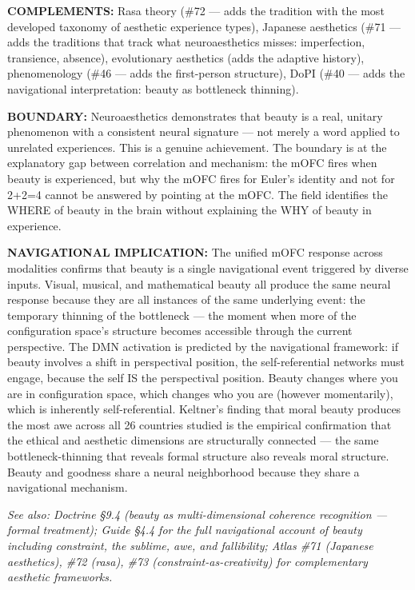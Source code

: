 \textbf{COMPLEMENTS:} Rasa theory (\#72 — adds the tradition with the most developed taxonomy of aesthetic experience types), Japanese aesthetics (\#71 — adds the traditions that track what neuroaesthetics misses: imperfection, transience, absence), evolutionary aesthetics (adds the adaptive history), phenomenology (\#46 — adds the first-person structure), DoPI (\#40 — adds the navigational interpretation: beauty as bottleneck thinning).


\textbf{BOUNDARY:} Neuroaesthetics demonstrates that beauty is a real, unitary phenomenon with a consistent neural signature — not merely a word applied to unrelated experiences. This is a genuine achievement. The boundary is at the explanatory gap between correlation and mechanism: the mOFC fires when beauty is experienced, but why the mOFC fires for Euler's identity and not for 2+2=4 cannot be answered by pointing at the mOFC. The field identifies the WHERE of beauty in the brain without explaining the WHY of beauty in experience.


\textbf{NAVIGATIONAL IMPLICATION:} The unified mOFC response across modalities confirms that beauty is a single navigational event triggered by diverse inputs. Visual, musical, and mathematical beauty all produce the same neural response because they are all instances of the same underlying event: the temporary thinning of the bottleneck — the moment when more of the configuration space's structure becomes accessible through the current perspective. The DMN activation is predicted by the navigational framework: if beauty involves a shift in perspectival position, the self-referential networks must engage, because the self IS the perspectival position. Beauty changes where you are in configuration space, which changes who you are (however momentarily), which is inherently self-referential. Keltner's finding that moral beauty produces the most awe across all 26 countries studied is the empirical confirmation that the ethical and aesthetic dimensions are structurally connected — the same bottleneck-thinning that reveals formal structure also reveals moral structure. Beauty and goodness share a neural neighborhood because they share a navigational mechanism.


\textit{See also: Doctrine §9.4 (beauty as multi-dimensional coherence recognition — formal treatment); Guide §4.4 for the full navigational account of beauty including constraint, the sublime, awe, and fallibility; Atlas \#71 (Japanese aesthetics), \#72 (rasa), \#73 (constraint-as-creativity) for complementary aesthetic frameworks.}


